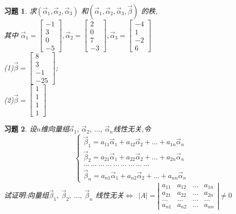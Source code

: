 \documentclass[a4paper]{book}
\newtheorem{ex}{习题}[chapter]
\begin{document}
\begin{ex}\label{4.8}
求$(\vec{\alpha}_1,\vec{\alpha}_2,\vec{\alpha}_3)$ 和$(\vec{\alpha}_1,\vec{\alpha}_2,\vec{\alpha}_3,\vec{\beta})$ 的秩,\\
其中
$\vec{\alpha}_1=\begin{bmatrix}-1\\3\\0\\-5\end{bmatrix},\vec{\alpha}_2=\begin{bmatrix}2\\0\\7\\-3\end{bmatrix},
\vec{\alpha}_3=\begin{bmatrix}-4\\1\\-2\\6\end{bmatrix}$\\
(1)$\vec{\beta}=\begin{bmatrix} 8\\3\\-1\\-25\end{bmatrix}$;\\
(2)$\vec{\beta}=\begin{bmatrix} 1\\1\\1\\1\end{bmatrix}$
\end{ex}

\begin{ex}\label{4.9}
设$n$维向量组$\vec{\alpha}_1, \ \vec{\alpha}_2, \ \dots,\ \vec{\alpha}_n$线性无关,令
\begin{displaymath}
\left\{\begin{aligned}\vec{\beta}_1=a_{11}\vec{\alpha}_1+a_{12}\vec{\alpha}_2+\dots+a_{1n}\vec{\alpha}_n \\ \vec{\beta}_2=a_{21}\vec{\alpha}_1+a_{22}\vec{\alpha}_2+\dots+a_{2n}\vec{\alpha}_n \\ \dots \ \dots \ \dots
\ \dots \ \dots \ \dots  \ \dots \ \dots   \ \dots   \\ \vec{\beta}_n=a_{n1}\vec{\alpha}_1+a_{n2}\vec{\alpha}_2+\dots+a_{nn}\vec{\alpha}_n\end{aligned}\right.
\end{displaymath}
试证明:向量组$\vec{\beta}_1,\ \vec{\beta}_2,\ \dots,\ \vec{\beta}_n$ 线性无关$\Leftrightarrow$\ $|A|=\left|\begin{array}{cccc}a_{11}&a_{12}&\dots&a_{1n}
\\a_{21}&a_{22}&\dots&a_{2n}\\ \dots&\dots&\dots&\dots\\a_{n1}&a_{n2}&\dots&a_{nn}\end{array}\right|\not=0$
\end{ex}
\end{document}

